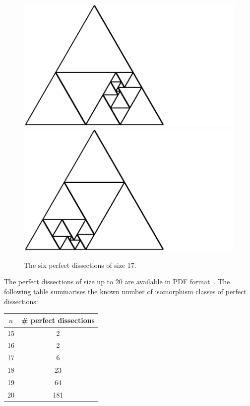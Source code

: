 \documentclass[12pt,amstags,fleqn]{article}
\theoremstyle{plain}
\theoremstyle{definition}
\begin{document}
\begin{figure}[htbp]
\begin{center}
\includegraphics{output-dissections-perfect-dissection17_i455488_r2_c5.pdf}\includegraphics{output-dissections-perfect-dissection17_i483193_r2_c6.pdf}
\end{center}
\caption{The six perfect dissections of size $17$.}
\label{figPerfect17}
\end{figure}
%
The perfect dissections of size up to $20$ are available in PDF format~\cite{dissections}.
The following table summarises the known number of isomorphism classes
of perfect dissections:

\begin{center}
\begin{tabular}{|c|c|}
\hline $n$ & \# perfect dissections \\
\hline
\hline 15 & 2 \\
\hline 16 & 2 \\
\hline 17 & 6 \\
\hline 18 & 23 \\
\hline 19 & 64 \\
\hline 20 & 181 \\
\hline
\end{tabular}
\end{center}
\end{document}
